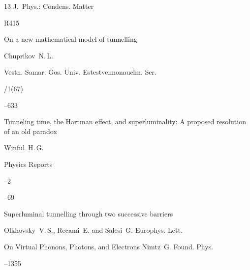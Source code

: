 \begin{thebibliography}{13}
\jour J.~Phys.: Condens. Matter 




\papernumber R415




\paper  On a new mathematical model of tunnelling 

\by Chuprikov~N.\,L. 

\jour Vestn. Samar. Gos. Univ. Estest\-venno\-nau\-chn. Ser.


/1(67)

--633




\paper  Tunneling time, the Hartman effect, and superluminality: A proposed resolution of an old paradox 

\by Winful~H.\,G. 

\jour Physics Reports 



--2

--69










\paper  Superluminal tunnelling through two successive barriers \by

Olkhovsky~V.\,S., Recami~E. and Salesi~G. \jour Europhys. Lett.   





\paper  On Virtual Phonons, Photons, and Electrons \by Nimtz~G. \jour Found. Phys.

   --1355





\end{thebibliography}



\noindent

\hskip6.5cm \thedate \par\noindent

\hskip6.5cm\therevdate\par







\makeengtitlem



\newpage





%

%

